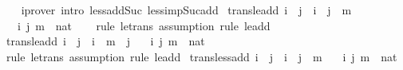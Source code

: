 \begin{isabellebody}
%
\isadelimproof
\ \ %
\endisadelimproof
%
\isatagproof
{}\isamarkupfalse%
\ {\isacharparenleft}{\kern0pt}iprover\ intro{\isacharbang}{\kern0pt}{\isacharcolon}{\kern0pt}\ less{\isacharunderscore}{\kern0pt}add{\isacharunderscore}{\kern0pt}Suc{}\ less{\isacharunderscore}{\kern0pt}imp{\isacharunderscore}{\kern0pt}Suc{\isacharunderscore}{\kern0pt}add{\isacharparenright}{\kern0pt}%
\endisatagproof
{\isafoldproof}%
%
\isadelimproof
\isanewline
%
\endisadelimproof
\isanewline
{}\isamarkupfalse%
\ trans{\isacharunderscore}{\kern0pt}le{\isacharunderscore}{\kern0pt}add{}{\isacharcolon}{\kern0pt}\ {\isachardoublequoteopen}i\ {\isasymle}\ j\ {\isasymLongrightarrow}\ i\ {\isasymle}\ j\ {\isacharplus}{\kern0pt}\ m{\isachardoublequoteclose}\isanewline
\ \ \ i\ j\ m\ {\isacharcolon}{\kern0pt}{\isacharcolon}{\kern0pt}\ nat\isanewline
%
\isadelimproof
\ \ %
\endisadelimproof
%
\isatagproof
{}\isamarkupfalse%
\ {\isacharparenleft}{\kern0pt}rule\ le{\isacharunderscore}{\kern0pt}trans{\isacharcomma}{\kern0pt}\ assumption{\isacharcomma}{\kern0pt}\ rule\ le{\isacharunderscore}{\kern0pt}add{}{\isacharparenright}{\kern0pt}%
\endisatagproof
{\isafoldproof}%
%
\isadelimproof
\isanewline
%
\endisadelimproof
\isanewline
{}\isamarkupfalse%
\ trans{\isacharunderscore}{\kern0pt}le{\isacharunderscore}{\kern0pt}add{}{\isacharcolon}{\kern0pt}\ {\isachardoublequoteopen}i\ {\isasymle}\ j\ {\isasymLongrightarrow}\ i\ {\isasymle}\ m\ {\isacharplus}{\kern0pt}\ j{\isachardoublequoteclose}\isanewline
\ \ \ i\ j\ m\ {\isacharcolon}{\kern0pt}{\isacharcolon}{\kern0pt}\ nat\isanewline
%
\isadelimproof
\ \ %
\endisadelimproof
%
\isatagproof
{}\isamarkupfalse%
\ {\isacharparenleft}{\kern0pt}rule\ le{\isacharunderscore}{\kern0pt}trans{\isacharcomma}{\kern0pt}\ assumption{\isacharcomma}{\kern0pt}\ rule\ le{\isacharunderscore}{\kern0pt}add{}{\isacharparenright}{\kern0pt}%
\endisatagproof
{\isafoldproof}%
%
\isadelimproof
\isanewline
%
\endisadelimproof
\isanewline
{}\isamarkupfalse%
\ trans{\isacharunderscore}{\kern0pt}less{\isacharunderscore}{\kern0pt}add{}{\isacharcolon}{\kern0pt}\ {\isachardoublequoteopen}i\ {\isacharless}{\kern0pt}\ j\ {\isasymLongrightarrow}\ i\ {\isacharless}{\kern0pt}\ j\ {\isacharplus}{\kern0pt}\ m{\isachardoublequoteclose}\isanewline
\ \ \ i\ j\ m\ {\isacharcolon}{\kern0pt}{\isacharcolon}{\kern0pt}\ nat\isanewline
%
\isadelimproof
\ \ %
\endisadelimproof
%
\isatagproof
{}\isamarkupfalse%

\end{isabellebody}

